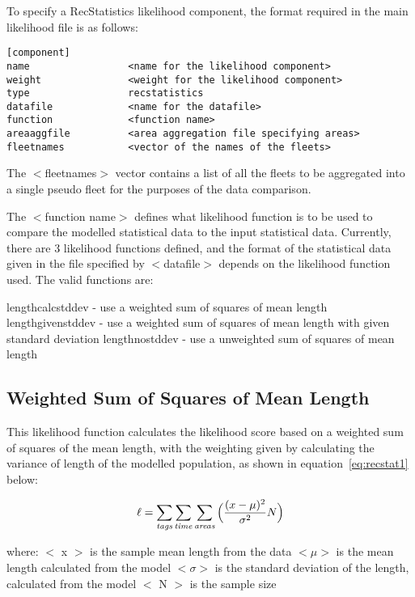 \documentclass [a4paper, 10pt]{book}
\begin{document}
\bigskip
To specify a RecStatistics likelihood component, the format required in the main likelihood file is as follows:

{\small\begin{verbatim}
[component]
name                 <name for the likelihood component>
weight               <weight for the likelihood component>
type                 recstatistics
datafile             <name for the datafile>
function             <function name>
areaaggfile          <area aggregation file specifying areas>
fleetnames           <vector of the names of the fleets>
\end{verbatim}}

The $<$fleetnames$>$ vector contains a list of all the fleets to be aggregated into a single pseudo fleet for the purposes of the data comparison.

\bigskip
The $<$function name$>$ defines what likelihood function is to be used to compare the modelled statistical data to the input statistical data.  Currently, there are 3 likelihood functions defined, and the format of the statistical data given in the file specified by $<$datafile$>$ depends on the likelihood function used.  The valid functions are:

\bigskip
lengthcalcstddev - use a weighted sum of squares of mean length\newline
lengthgivenstddev - use a weighted sum of squares of mean length with given standard deviation\newline
lengthnostddev - use a unweighted sum of squares of mean length

\subsection{Weighted Sum of Squares of Mean Length}
This likelihood function calculates the likelihood score based on a weighted sum of squares of the mean length, with the weighting given by calculating the variance of length of the modelled population, as shown in equation~\ref{eq:recstat1} below:

\begin{equation}\label{eq:recstat1}
\ell = \sum_{\it tags}\sum_{\it time}\sum_{\it areas} \Big(\frac{(x-\mu)^2} {\sigma^2} N\Big)
\end{equation}

where:\newline
$<$ x $>$ is the sample mean length from the data\newline
$<\mu>$ is the mean length calculated from the model\newline
$<\sigma>$ is the standard deviation of the length, calculated from the model\newline
$<$ N $>$ is the sample size
\end{document}
